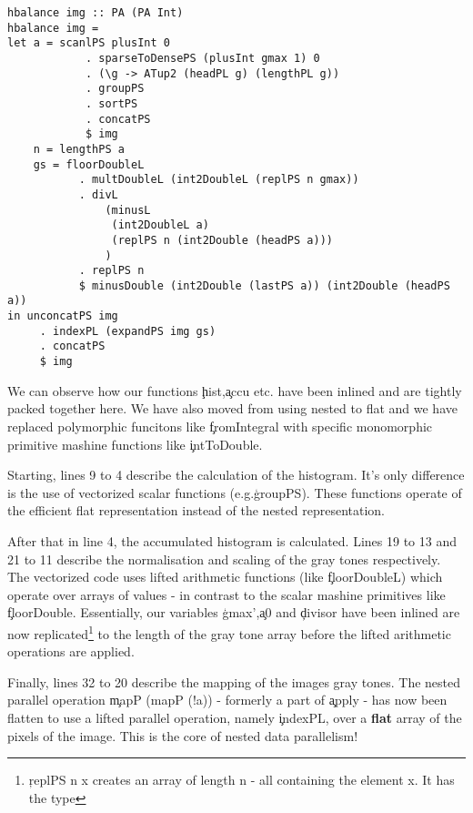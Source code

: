     \begin{lstlisting}
hbalance img :: PA (PA Int)
hbalance img = 
let a = scanlPS plusInt 0
            . sparseToDensePS (plusInt gmax 1) 0
            . (\g -> ATup2 (headPL g) (lengthPL g))
            . groupPS
            . sortPS
            . concatPS
            $ img
    n = lengthPS a
    gs = floorDoubleL
           . multDoubleL (int2DoubleL (replPS n gmax))
           . divL
               (minusL
                (int2DoubleL a)
                (replPS n (int2Double (headPS a)))
               )
           . replPS n
           $ minusDouble (int2Double (lastPS a)) (int2Double (headPS a))
in unconcatPS img
     . indexPL (expandPS img gs)
     . concatPS
     $ img
    \end{lstlisting} %
    We can observe how our functions \c{hist},\c{accu} etc. have been inlined and are tightly packed together here.
    We have also moved from using nested \pan to flat \pav and we have replaced polymorphic funcitons like \c{fromIntegral}
    with specific monomorphic primitive mashine functions like \c{intToDouble}.
    
    Starting, lines 9 to 4 describe the calculation of the histogram.
    It's only difference is the use of vectorized scalar functions (e.g.\c{groupPS}). These functions operate of the efficient flat
    representation instead of the nested representation.
    
    
    After that in line 4, the accumulated histogram is calculated. Lines 19 to 13 and 21 to 11
    describe the normalisation and scaling of the gray tones respectively. The vectorized code uses
    lifted arithmetic functions (like \c{floorDoubleL}) which operate over arrays of values - in contrast to
    the scalar mashine primitives like \c{floorDouble}. Essentially, our variables \c{gmax'},\c{a0} and \c{divisor}
    have been inlined are now replicated\footnote{\c{replPS n x} creates an array of length n - all containing the element x. It has the type }
    to the length of the gray tone array before the lifted arithmetic operations are applied.
    
    
    Finally, lines 32 to 20 describe the mapping of the images gray tones.
    The nested parallel operation \c{mapP (mapP (!a))} - formerly a part of \c{apply} - 
    has now been flatten to use a lifted parallel operation, namely \c{indexPL}, over a \textbf{flat} array of
    the pixels of the image. This is the core of nested data parallelism!
    
